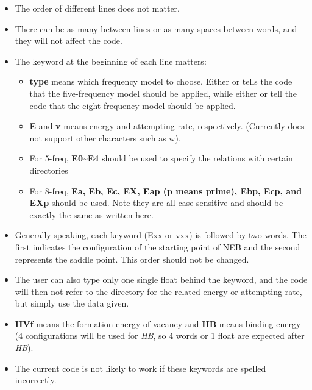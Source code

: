 \documentclass[letterpaper,10pt,english]{sphinxmanual}
\begin{document}
\begin{itemize}
\item {} 
The order of different lines does not matter.

\item {} 
There can be as many  between lines or as many spaces between words, and they will not affect the code.

\item {} 
The keyword at the beginning of each line matters:
\begin{itemize}
\item {} 
\textbf{type} means which frequency model to choose. Either  or  tells the code that the five-frequency model should be applied, while either  or  tell the code that the eight-frequency model should be applied.

\item {} 
\textbf{E} and \textbf{v} means energy and attempting rate, respectively. (Currently does not support other characters such as w).

\item {} 
For 5-freq, \textbf{E0\textasciitilde{}E4} should be used to specify the relations with certain directories

\item {} 
For 8-freq, \textbf{Ea, Eb, Ec, EX, Eap (p means prime), Ebp, Ecp, and EXp} should be used. Note they are all case sensitive and should be exactly the same as written here.

\end{itemize}

\item {} 
Generally speaking, each keyword (Exx or vxx) is followed by two words. The first indicates the configuration of the starting point of NEB and the second represents the saddle point. This order should not be changed.

\item {} 
The user can also type only one single float behind the keyword, and the code will then not refer to the directory for the related energy or attempting rate, but simply use the data given.

\item {} 
\textbf{HVf} means the formation energy of vacancy and \textbf{HB} means binding energy (4 configurations will be used for \emph{HB}, so 4 words or 1 float are expected after \emph{HB}).

\item {} 
The current code is not likely to work if these keywords are spelled incorrectly.


\end{itemize}
\end{document}
